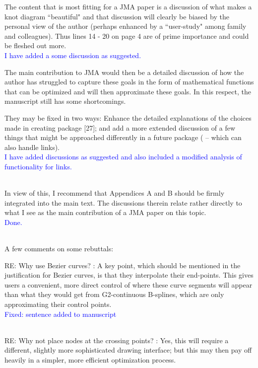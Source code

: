 \documentclass[12pt]{article}
\begin{document}
The content that is most fitting for a JMA paper is a discussion of
what makes a knot diagram ``beautiful" and that discussion will
clearly be biased by the personal view of the author (perhaps enhanced
by a ``user-study" among family and colleagues).  Thus lines 14 - 20
on page 4 are of prime importance and could be fleshed out more.
\textcolor{blue}{\\I have added a some discussion as suggested.}

The main contribution to JMA would then be a detailed discussion of
how the author has struggled to capture these goals in the form of
mathematical functions that can be optimized and will then approximate
these goals.  In this respect, the manuscript still has some
shortcomings.

They may be fixed in two ways: Enhance the detailed explanations of
the choices made in creating package [27]; and add a more extended
discussion of a few things that might be approached differently in a
future package ( -- which can also handle links).
\textcolor{blue}{\\I have added discussions as suggested and also
  included a modified analysis of functionality for links.\\ \\}

In view of this, I recommend that Appendices A and B should be firmly
integrated into the main text.  The discussions therein relate rather
directly to what I see as the main contribution of a JMA paper on this
topic.\textcolor{blue}{\\Done.\\ \\}

A few comments on some rebuttals:

RE: Why use Bezier curves? : A key point, which should be mentioned in
the justification for Bezier curves, is that they interpolate their
end-points. This gives users a convenient, more direct control of
where these curve segments will appear than what they would get from
G2-continuous B-splines, which are only approximating their control
points.\textcolor{blue}{\\Fixed: sentence added to manuscript\\ \\}

RE: Why not place nodes at the crossing points? : Yes, this will
require a different, slightly more sophisticated drawing interface;
but this may then pay off heavily in a simpler, more efficient
optimization process.
\end{document}
